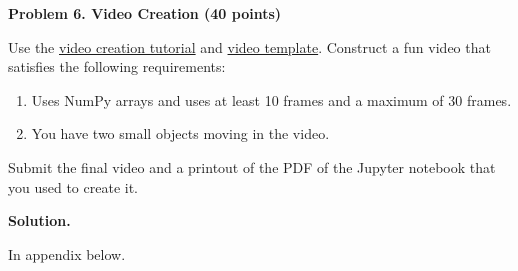 \documentclass[11pt]{article}
\begin{document}
	\newpage

	\noindent\textbf{Problem 6. Video Creation (40 points)}
	
	Use the
	\href{https://github.com/pattichis/AIML/blob/main/Session_8_Create_videos.ipynb}{video creation tutorial}
	and
	\href{https://github.com/pattichis/AIML/blob/main/Session_8_Video_template.ipynb}{video template}. Construct a fun video that satisfies the following requirements:
	
	\begin{enumerate}[label=\textbf{(\alph*)}, leftmargin=1.2cm]
		\item Uses NumPy arrays and uses at least 10 frames and a maximum of 30 frames.
		\item You have two small objects moving in the video.
	\end{enumerate}
	
	Submit the final video and a printout of the PDF of the Jupyter notebook that you used to create it.
	
	
	\vspace{1em}
	\noindent\textbf{Solution.}
	
	In appendix below.
	
	\newpage
	
\end{document}
